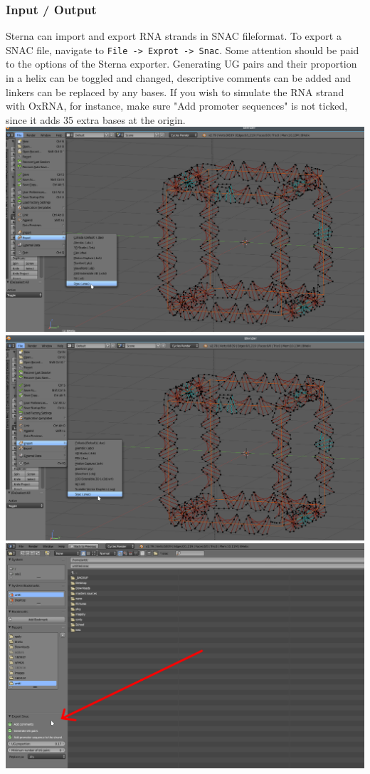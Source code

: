   \subsubsection{Input / Output}
    Sterna can import and export RNA strands in SNAC fileformat. To export a SNAC file, navigate to \verb+File -> Exprot -> Snac+. Some attention should be paid to the options of the Sterna exporter. Generating UG pairs and their proportion in a helix can be toggled and changed, descriptive comments can be added and linkers can be replaced by any bases. If you wish to simulate the RNA strand with OxRNA, for instance, make sure "Add promoter sequences" is not ticked, since it adds 35 extra bases at the origin.
    \includegraphics[width=\textwidth]{images/Sterna_8}
    \includegraphics[width=\textwidth]{images/Sterna_9}
    \includegraphics[width=\textwidth]{images/Sterna_10}
